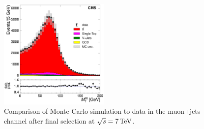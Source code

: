 \begin{figure}[hbtp]
     \includegraphics[width=0.48\textwidth]{Chapters/04_Analysis/04b_XSections/images/control_plots/before_fit/7TeV/MuPlusJets_patType1CorrectedPFMet_MT_2orMoreBtags_with_ratio.pdf}\hfill
     \caption{Comparison of Monte Carlo simulation to data in the muon+jets channel after final
     selection at $\sqrt{s}=7\,\text{Te\hspace{-.08em}V}$.}
     \label{fig:data_mc_comparison_7TeV_muon}
\end{figure}
 
